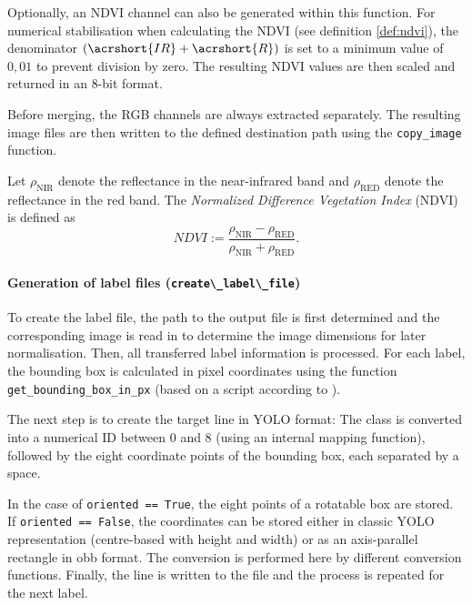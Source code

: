 Optionally, an \acrshort{NDVI} channel can also be generated within this function. For numerical stabilisation when calculating the \acrshort{NDVI} (see definition \ref{def:ndvi}), the denominator $(\acrshort{IR} + \acrshort{R})$ is set to a minimum value of $0{,}01$ to prevent division by zero. The resulting \acrshort{NDVI} values are then scaled and returned in an 8-bit format.

Before merging, the \acrshort{RGB} channels are always extracted separately. The resulting image files are then written to the defined destination path using the \lstinline|copy_image| function.



\begin{definition}
Let $\rho_{\text{NIR}}$ denote the reflectance in the near-infrared band and 
$\rho_{\text{RED}}$ denote the reflectance in the red band. 
The \textit{Normalized Difference Vegetation Index} (NDVI) is defined as
\begin{equation}
NDVI := \frac{\rho_{\text{NIR}} - \rho_{\text{RED}}}{\rho_{\text{NIR}} + \rho_{\text{RED}}}.
\end{equation}
\label{def:ndvi}
\end{definition}



\paragraph{Generation of label files (\lstinline|create\_label\_file|)}
\hypertarget{par:create_label_file}{}

To create the label file, the path to the output file is first determined and the corresponding image is read in to determine the image dimensions for later normalisation. Then, all transferred label information is processed. For each label, the bounding box is calculated in pixel coordinates using the function \lstinline|get_bounding_box_in_px| (based on a script according to \citeauthor{Razakarivony2015}).

The next step is to create the target line in \acrshort{YOLO} format: The class is converted into a numerical \acrshort{ID} between 0 and 8 (using an internal mapping function), followed by the eight coordinate points of the bounding box, each separated by a space.

In the case of \lstinline|oriented == True|, the eight points of a rotatable box are stored. If \lstinline|oriented == False|, the coordinates can be stored either in classic \acrshort{YOLO} representation (centre-based with height and width) or as an axis-parallel rectangle in \acrshort{obb} format. The conversion is performed here by different conversion functions. Finally, the line is written to the file and the process is repeated for the next label.


